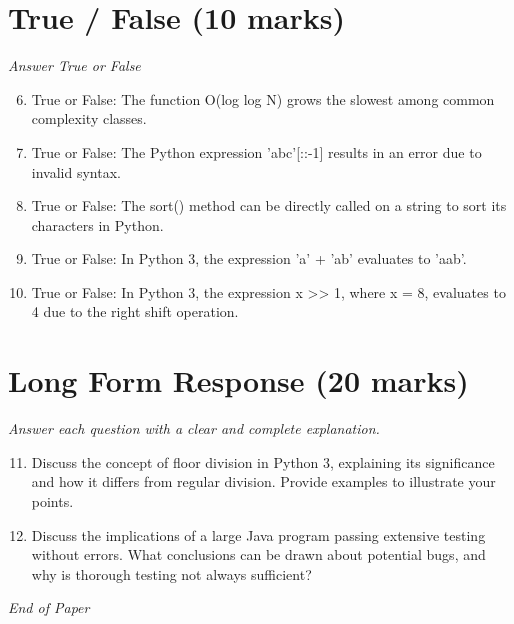 \documentclass[12pt]{article}
\begin{document}
\section*{True / False (10 marks)}
\textit{Answer True or False}
\begin{enumerate}[label=\arabic*.]
\setcounter{enumi}{5}
\item True or False: The function O(log log N) grows the slowest among common complexity classes.
\item True or False: The Python expression 'abc'[::-1] results in an error due to invalid syntax.
\item True or False: The sort() method can be directly called on a string to sort its characters in Python.
\item True or False: In Python 3, the expression 'a' + 'ab' evaluates to 'aab'.
\item True or False: In Python 3, the expression x \textgreater{}\textgreater{} 1, where x = 8, evaluates to 4 due to the right shift operation.
\end{enumerate}

\section*{Long Form Response (20 marks)}
\textit{Answer each question with a clear and complete explanation.}
\begin{enumerate}[label=\arabic*.]
\setcounter{enumi}{10}
\item Discuss the concept of floor division in Python 3, explaining its significance and how it differs from regular division. Provide examples to illustrate your points.
\item Discuss the implications of a large Java program passing extensive testing without errors. What conclusions can be drawn about potential bugs, and why is thorough testing not always sufficient?
\end{enumerate}

\vfill
\noindent\textit{End of Paper}
\end{document}
